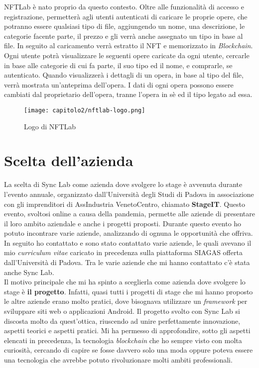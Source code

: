 NFTLab è nato proprio da questo contesto. Oltre alle funzionalità di accesso e registrazione, permetterà agli utenti autenticati di caricare le proprie opere, che potranno essere qualsiasi tipo di file, aggiungendo un nome, una descrizione, le categorie facente parte, il prezzo e gli verrà anche assegnato un tipo in base al file. In seguito al caricamento verrà estratto il NFT e memorizzato in \emph{Blockchain}. 
Ogni utente potrà visualizzare le seguenti opere caricate da ogni utente, cercarle in base alle categorie di cui fa parte, il suo tipo ed il nome, e comprarle, se autenticato. Quando visualizzerà i dettagli di un opera, in base al tipo del file, verrà mostrata un'anteprima dell'opera.
I dati di ogni opera possono essere cambiati dal proprietario dell'opera, tranne l'opera in sè ed il tipo legato ad essa.

\begin{figure}[!h]
  \centering
  \texttt{[image: capitolo2/nftlab-logo.png]}
  \caption{Logo di NFTLab}
\end{figure}


\section{Scelta dell'azienda}
La scelta di Sync Lab come azienda dove svolgere lo stage è avvenuta durante l'evento annuale, organizzato dall'Università degli Studi di Padova in associazione con gli imprenditori di AssIndustria VenetoCentro, chiamato \textbf{StageIT}. Questo evento, svoltosi online a causa della pandemia, permette alle aziende di presentare il loro ambito aziendale e anche i progetti proposti. Durante questo evento ho potuto incontrare varie aziende, analizzando di ognuna le opportunità che offriva. In seguito ho contattato e sono stato contattato varie aziende, le quali avevano il mio \textit{curriculum vitae} caricato in precedenza sulla piattaforma SIAGAS offerta dall'Università di Padova. Tra le varie aziende che mi hanno contattato c'è stata anche Sync Lab. \\

Il motivo principale che mi ha spinto a sceglierla come azienda dove svolgere lo stage è \textbf{il progetto}. Infatti, quasi tutti i progetti di stage che mi hanno proposto le altre aziende erano molto pratici, dove bisognava utilizzare un \textit{framework} per sviluppare siti web o applicazioni Android. Il progetto svolto con Sync Lab si discosta molto da quest'ottica, riuscendo ad unire perfettamente innovazione, aspetti teorici e aspetti pratici. Mi ha permesso di approfondire, sotto gli aspetti elencati in precedenza, la tecnologia \textit{blockchain} che ho sempre visto con molta curiosità, cercando di capire se fosse davvero solo una moda oppure poteva essere una tecnologia che avrebbe potuto rivoluzionare molti ambiti professionali. \\

